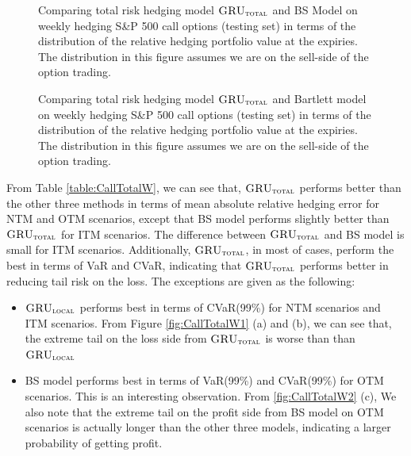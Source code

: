 \documentclass[letterpaper,12pt,titlepage,oneside,final]{book}
\numberwithin{equation}{section}
\theoremstyle{definition}
\newcommand{\modelT}{\textsc{GRU}_{\textsc{total}}}
\newcommand{\modelL}{\textsc{GRU}_{\textsc{local}}}
\begin{document}
\begin{figure}[htp!]
	\caption{Comparing total risk hedging  model $\modelT$ and BS Model  on weekly hedging S\&P 500 call options (testing set) in terms of the distribution of the  relative hedging portfolio value at the expiries. The distribution in this figure assumes we are on the sell-side of the option trading.} 
	\label{fig:CallTotalW2}
	\centering
	\caption{Comparing total risk hedging model $\modelT$ and Bartlett model on weekly hedging S\&P 500 call options (testing set) in terms of the distribution of the  relative hedging portfolio value at the expiries. The distribution in this figure assumes we are on the sell-side of the option trading.} \label{fig:CallTotalW3}
\end{figure}

From Table \ref{table:CallTotalW}, we can see that, $\modelT$ performs better than the other three methods in terms of 
mean absolute relative hedging error for NTM and OTM scenarios, except that BS model performs slightly better than   $\modelT$ for ITM scenarios. The difference between  $\modelT$  and BS model is small for ITM scenarios. Additionally, $\modelT$, in most of cases, perform the best in terms of VaR and CVaR, indicating that $\modelT$ performs better in reducing tail risk on the loss.  The exceptions are given as the following:
\begin{itemize}
	\item $\modelL$ performs best in terms of  CVaR(99\%) for NTM scenarios and ITM scenarios. From Figure \ref{fig:CallTotalW1} (a) and (b), we can see that, the extreme tail on the loss side from  $\modelT$ is worse than than $\modelL$
	\item  BS model performs best in terms of  VaR(99\%) and  CVaR(99\%) for OTM scenarios. This is an interesting observation. From \ref{fig:CallTotalW2} (c), We also note that the extreme tail on the profit side from BS model on OTM scenarios is actually longer than the other three models, indicating a larger probability of getting  profit. 
\end{itemize}
\end{document}
